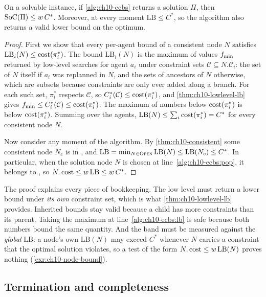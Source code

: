 \begin{theorem}
\label{thm:ch10-ecbs}
On a solvable instance, if \cref{alg:ch10-ecbs} returns a solution $\Pi$,
then $\mathrm{SoC}(\Pi) \le w\,C^*$. Moreover, at every moment $\mathrm{LB} \le C^*$,
so the algorithm also returns a valid lower bound on the optimum.
\end{theorem}
\begin{proof}
First we show that every per-agent bound of a consistent node $N$ satisfies
$\mathrm{LB}_i(N) \le \operatorname{cost}(\pi_i^*)$. The bound $\mathrm{LB}_i(N)$ is the
maximum of values $f_{\min}$ returned by low-level searches for agent
$a_i$ under constraint sets $\mathcal{C} \subseteq N.\mathcal{C}_i$: the set of
$N$ itself if $a_i$ was replanned in $N$, and the sets of ancestors of $N$
otherwise, which are subsets because constraints are only ever added along a
branch. For each such set, $\pi_i^*$ respects $\mathcal{C}$, so
$C_i^*(\mathcal{C}) \le \operatorname{cost}(\pi_i^*)$, and \cref{thm:ch10-lowlevel-lb}
gives $f_{\min} \le C_i^*(\mathcal{C}) \le \operatorname{cost}(\pi_i^*)$. The maximum
of numbers below $\operatorname{cost}(\pi_i^*)$ is below $\operatorname{cost}(\pi_i^*)$. Summing over the
agents, $\mathrm{LB}(N) \le \sum_i \operatorname{cost}(\pi_i^*) = C^*$ for every consistent
node $N$.

Now consider any moment of the algorithm. By \cref{thm:ch10-consistent} some
consistent node $N_c$ is in \Open, and $\mathrm{LB} = \min_{N \in \textsc{Open}}
\mathrm{LB}(N) \le \mathrm{LB}(N_c) \le C^*$. In particular, when the
solution node $N$ is chosen at line~\ref{alg:ch10-ecbs:pop}, it belongs to
\Focal, so $N.\operatorname{cost} \le w\,\mathrm{LB} \le w\,C^*$.
\end{proof}

The proof explains every piece of bookkeeping. The low level must return a
lower bound under \emph{its own} constraint set, which is what
\cref{thm:ch10-lowlevel-lb} provides. Inherited bounds stay valid because a
child has more constraints than its parent. Taking the maximum at
line~\ref{alg:ch10-ecbs:lb} is safe because both numbers bound the same
quantity. And the band must be measured against the \emph{global}
$\mathrm{LB}$: a node's own $\mathrm{LB}(N)$ may exceed $C^*$ whenever $N$
carries a constraint that the optimal solution violates, so a test of the
form $N.\operatorname{cost} \le w\,\mathrm{LB}(N)$ proves nothing
(\cref{exr:ch10-node-bound}).

\subsection{Termination and completeness}

